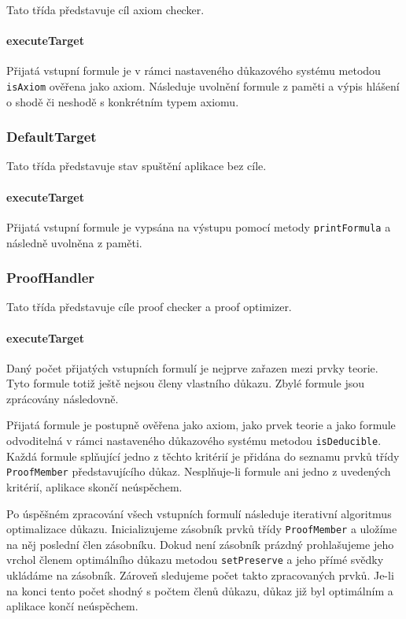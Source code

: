 \documentclass[thesis=B,czech,hidelinks]{thesis}[2012/06/26]
\begin{document}
Tato třída představuje cíl axiom checker.

\paragraph{executeTarget}

Přijatá vstupní formule je v rámci nastaveného důkazového systému metodou \texttt{isAxiom} ověřena jako axiom. Následuje uvolnění formule z paměti a výpis hlášení o shodě či neshodě s konkrétním typem axiomu.

\subsubsection{DefaultTarget}

Tato třída představuje stav spuštění aplikace bez cíle.

\paragraph{executeTarget}

Přijatá vstupní formule je vypsána na výstupu pomocí metody \texttt{printFormula} a následně uvolněna z paměti.

\subsubsection{ProofHandler}

Tato třída představuje cíle proof checker a proof optimizer.

\paragraph{executeTarget}

Daný počet přijatých vstupních formulí je nejprve zařazen mezi prvky teorie. Tyto formule totiž ještě nejsou členy vlastního důkazu. Zbylé formule jsou zprácovány následovně.

Přijatá formule je postupně ověřena jako axiom, jako prvek teorie a jako formule odvoditelná v rámci nastaveného důkazového systému metodou \texttt{isDeducible}. Každá formule splňující jedno z těchto kritérií je přidána do seznamu prvků třídy \texttt{ProofMember} představujícího důkaz. Nesplňuje-li formule ani jedno z uvedených kritérií, aplikace skončí neúspěchem.

Po úspěšném zpracování všech vstupních formulí následuje iterativní algoritmus optimalizace důkazu. Inicializujeme zásobník prvků třídy \texttt{ProofMember} a uložíme na něj poslední člen zásobníku. Dokud není zásobník prázdný prohlašujeme jeho vrchol členem optimálního důkazu metodou \texttt{setPreserve} a jeho přímé svědky ukládáme na zásobník. Zároveň sledujeme počet takto zpracovaných prvků. Je-li na konci tento počet shodný s počtem členů důkazu, důkaz již byl optimálním a aplikace končí neúspěchem.
\end{document}
